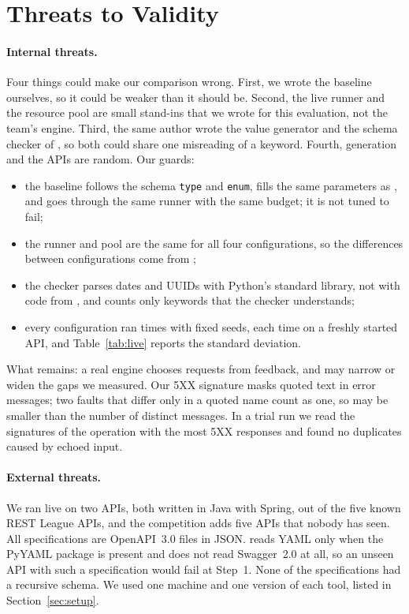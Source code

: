 \section{Threats to Validity}
\label{sec:threats}

\paragraph{Internal threats.} Four things could make our comparison wrong.
First, we wrote the baseline ourselves, so it could be weaker than it should
be. Second, the live runner and the resource pool are small stand-ins that we
wrote for this evaluation, not the team's engine. Third, the same author wrote
the value generator and the schema checker of , so both could share
one misreading of a keyword. Fourth, generation and the APIs are random. Our
guards:
\begin{itemize}
  \item the baseline follows the schema \texttt{type} and \texttt{enum},
    fills the same parameters as \tool, and goes through the same runner with
    the same budget; it is not tuned to fail;
  \item the runner and pool are the same for all four configurations, so the
    differences between configurations come from \tool;
  \item the checker parses dates and UUIDs with Python's standard library, not
    with code from \tool, and  counts only keywords that the checker
    understands;
  \item every configuration ran \NReps times with fixed seeds, each time on a
    freshly started API, and Table~\ref{tab:live} reports the standard
    deviation.
\end{itemize}
What remains: a real engine chooses requests from feedback, and may narrow or
widen the gaps we measured. Our 5XX signature masks quoted text in error
messages; two faults that differ only in a quoted name count as one, so
\Faults may be smaller than the number of distinct messages. In a trial run
we read the signatures of the operation with the most 5XX responses and found
no duplicates caused by echoed input.

\paragraph{External threats.} We ran \tool live on two APIs, both written in
Java with Spring, out of the five known REST League APIs, and the competition
adds five APIs that nobody has seen. All \NSpecs specifications are
OpenAPI~3.0 files in JSON. \tool reads YAML only when the PyYAML package is
present and does not read Swagger~2.0 at all, so an unseen API with such a
specification would fail at Step~1. None of the specifications had a
recursive schema. We used one machine and one version of each tool, listed in
Section~\ref{sec:setup}.


